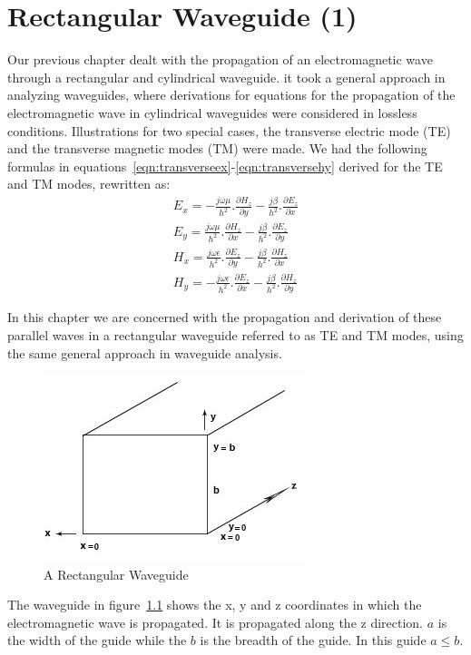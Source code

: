 \chapter{Rectangular Waveguide (1)}
Our previous chapter dealt with the propagation of an electromagnetic wave through a rectangular and cylindrical waveguide. it took a general approach in analyzing waveguides, where derivations for equations for the propagation of the electromagnetic wave in cylindrical waveguides were considered in lossless conditions. Illustrations for two special cases, the transverse electric mode (TE) and the transverse magnetic modes (TM) were made. We had the following formulas in equations~\ref{eqn:transverseex}-\ref{eqn:transversehy} derived for the TE and TM modes, rewritten as:
\begin{align*}
E_x = -\frac{j\omega\mu}{h^2}.\frac{\partial H_z}{\partial y} - \frac{j\beta}{h^2}.\frac{\partial E_z}{\partial x}\\
E_y = \frac{j\omega\mu}{h^2}.\frac{\partial H_z}{\partial x} - \frac{j\beta}{h^2}.\frac{\partial E_z}{\partial y}\\
H_x = \frac{j\omega\epsilon}{h^2}.\frac{\partial E_z}{\partial y} - \frac{j\beta}{h^2}.\frac{\partial H_z}{\partial x}\\
H_y = -\frac{j\omega\epsilon}{h^2}.\frac{\partial E_z}{\partial x} - \frac{j\beta}{h^2}.\frac{\partial H_z}{\partial y}
\end{align*}

In this chapter we are concerned with the propagation and derivation of these parallel waves in a rectangular waveguide referred to as TE and TM modes, using the same general approach in waveguide analysis.
\begin{figure}[h]
\centering
\includegraphics[width=0.7\linewidth]{./graphics/lec38fig1}
\caption{A Rectangular Waveguide}
\label{fig:lec38fig1}
\end{figure}
The waveguide in figure~\ref{fig:lec38fig1} shows the x, y and z coordinates in which the electromagnetic wave is propagated. It is propagated along the z direction. $a$ is the width of the guide while the $b$ is the breadth of the guide. In this guide $a \leq b$.

